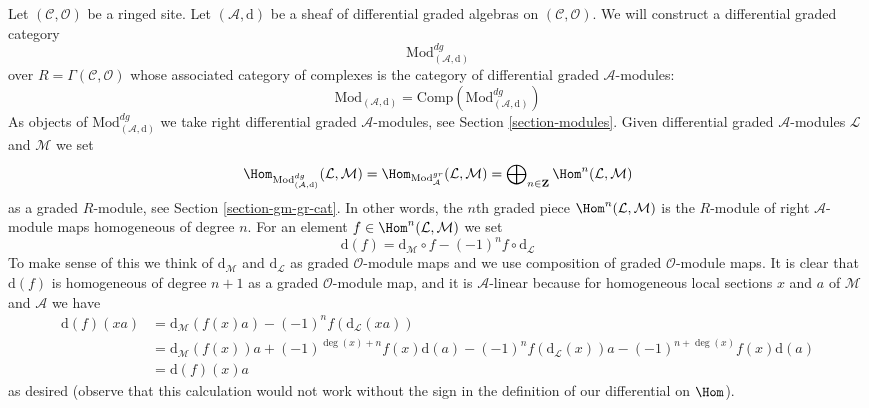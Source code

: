 \medskip\noindent
Let $(\mathcal{C}, \mathcal{O})$ be a ringed site.
Let $(\mathcal{A}, \text{d})$ be a sheaf of differential graded algebras
on $(\mathcal{C}, \mathcal{O})$. We will construct
a differential graded category
$$
\text{Mod}^{dg}_{(\mathcal{A}, \text{d})}
$$
over $R = \Gamma(\mathcal{C}, \mathcal{O})$ whose associated category
of complexes is the category of differential graded $\mathcal{A}$-modules:
$$
\text{Mod}_{(\mathcal{A}, \text{d})} =
\text{Comp}(\text{Mod}^{dg}_{(\mathcal{A}, \text{d})})
$$
As objects of $\text{Mod}^{dg}_{(\mathcal{A}, \text{d})}$ we take right
differential graded $\mathcal{A}$-modules, see
Section \ref{section-modules}. Given differential graded
$\mathcal{A}$-modules $\mathcal{L}$ and $\mathcal{M}$ we set
$$
\Hom_{\text{Mod}^{dg}_{(\mathcal{A}, \text{d})}}(\mathcal{L}, \mathcal{M}) =
\Hom_{\text{Mod}^{gr}_\mathcal{A}}(\mathcal{L}, \mathcal{M}) =
\bigoplus\nolimits_{n \in \mathbf{Z}} \Hom^n(\mathcal{L}, \mathcal{M})
$$
as a graded $R$-module, see Section \ref{section-gm-gr-cat}.
In other words, the $n$th graded piece
$\Hom^n(\mathcal{L}, \mathcal{M})$ is the $R$-module of right
$\mathcal{A}$-module maps homogeneous of degree $n$.
For an element $f \in \Hom^n(\mathcal{L}, \mathcal{M})$ we set
$$
\text{d}(f) =
\text{d}_\mathcal{M} \circ f - (-1)^n f \circ \text{d}_\mathcal{L}
$$
To make sense of this we think of $\text{d}_\mathcal{M}$ and
$\text{d}_\mathcal{L}$ as graded $\mathcal{O}$-module maps and
we use composition of graded $\mathcal{O}$-module maps.
It is clear that $\text{d}(f)$ is homogeneous of
degree $n + 1$ as a graded $\mathcal{O}$-module map, and it is
$\mathcal{A}$-linear because for homogeneous local sections $x$ and $a$
of $\mathcal{M}$ and $\mathcal{A}$ we have
\begin{align*}
\text{d}(f)(xa)
& =
\text{d}_\mathcal{M}(f(x) a) - (-1)^n f (\text{d}_\mathcal{L}(xa)) \\
& =
\text{d}_\mathcal{M}(f(x)) a + (-1)^{\deg(x) + n} f(x) \text{d}(a) 
- (-1)^n f(\text{d}_\mathcal{L}(x)) a - (-1)^{n + \deg(x)} f(x) \text{d}(a) \\
& = \text{d}(f)(x) a
\end{align*}
as desired (observe that this calculation would not work without the
sign in the definition of our differential on $\Hom$).


